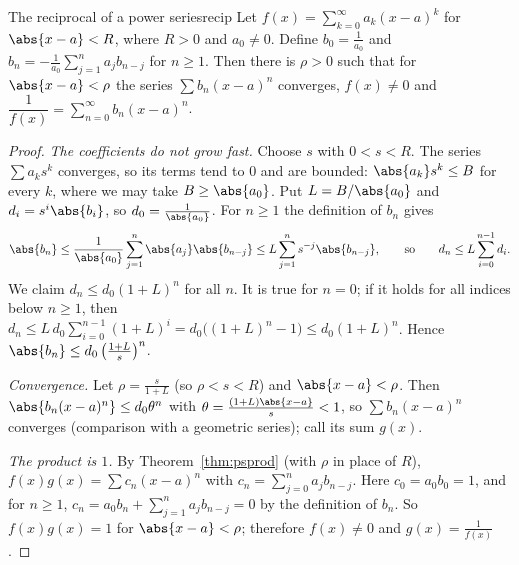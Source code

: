 \documentclass[11pt]{article}
\begin{document}
\begin{thm}{The reciprocal of a power series}{recip}
Let $f(x)=\sum_{k=0}^\infty a_k(x-a)^k$ for $\abs{x-a}<R$, where $R>0$ and $a_0\ne0$. Define $b_0=\frac1{a_0}$ and $b_n=-\frac1{a_0}\sum_{j=1}^na_jb_{n-j}$ for $n\ge1$. Then there is $\rho>0$ such that for $\abs{x-a}<\rho$ the series $\sum b_n(x-a)^n$ converges, $f(x)\ne0$ and $\dfrac1{f(x)}=\sum_{n=0}^\infty b_n(x-a)^n$.
\end{thm}
\begin{proof}
\emph{The coefficients do not grow fast.} Choose $s$ with $0<s<R$. The series $\sum a_ks^k$ converges, so its terms tend to $0$ and are bounded: $\abs{a_k}s^k\le B$ for every $k$, where we may take $B\ge\abs{a_0}$. Put $L=B/\abs{a_0}$ and $d_i=s^i\abs{b_i}$, so $d_0=\frac1{\abs{a_0}}$. For $n\ge1$ the definition of $b_n$ gives
\[
\abs{b_n}\le\frac1{\abs{a_0}}\sum_{j=1}^n\abs{a_j}\abs{b_{n-j}}\le L\sum_{j=1}^ns^{-j}\abs{b_{n-j}},\qquad\text{so}\qquad d_n\le L\sum_{i=0}^{n-1}d_i .
\]
We claim $d_n\le d_0(1+L)^n$ for all $n$. It is true for $n=0$; if it holds for all indices below $n\ge1$, then $d_n\le L\,d_0\sum_{i=0}^{n-1}(1+L)^i=d_0\bigl((1+L)^n-1\bigr)\le d_0(1+L)^n$. Hence $\abs{b_n}\le d_0\left(\frac{1+L}s\right)^n$.

\emph{Convergence.} Let $\rho=\frac s{1+L}$ (so $\rho<s<R$) and $\abs{x-a}<\rho$. Then $\abs{b_n(x-a)^n}\le d_0\theta^n$ with $\theta=\frac{(1+L)\abs{x-a}}s<1$, so $\sum b_n(x-a)^n$ converges (comparison with a geometric series); call its sum $g(x)$.

\emph{The product is $1$.} By Theorem~\ref{thm:psprod} (with $\rho$ in place of $R$), $f(x)g(x)=\sum c_n(x-a)^n$ with $c_n=\sum_{j=0}^na_jb_{n-j}$. Here $c_0=a_0b_0=1$, and for $n\ge1$, $c_n=a_0b_n+\sum_{j=1}^na_jb_{n-j}=0$ by the definition of $b_n$. So $f(x)g(x)=1$ for $\abs{x-a}<\rho$; therefore $f(x)\ne0$ and $g(x)=\frac1{f(x)}$.
\end{proof}
\end{document}
